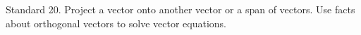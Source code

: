 Standard 20.	Project a vector onto another vector or a span of vectors. Use facts about orthogonal vectors to solve vector equations.


\ifprintanswers
\else %
 \newpage
\fi

\begin{solution}
    
\end{solution}